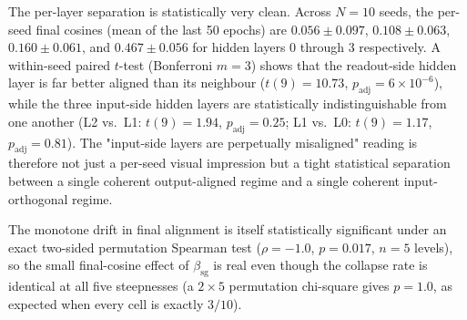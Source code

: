 
The per-layer separation is statistically very clean. Across $N = 10$ seeds,
the per-seed final cosines (mean of the last 50 epochs) are
$0.056 \pm 0.097$, $0.108 \pm 0.063$, $0.160 \pm 0.061$, and
$0.467 \pm 0.056$ for hidden layers $0$ through $3$ respectively. A
within-seed paired $t$-test (Bonferroni $m = 3$) shows that the readout-side
hidden layer is far better aligned than its neighbour ($t(9) = 10.73$,
$p_{\mathrm{adj}} = 6 \times 10^{-6}$), while the three input-side hidden
layers are statistically indistinguishable from one another (L2 vs.\ L1:
$t(9) = 1.94$, $p_{\mathrm{adj}} = 0.25$; L1 vs.\ L0: $t(9) = 1.17$,
$p_{\mathrm{adj}} = 0.81$). The "input-side layers are perpetually
misaligned" reading is therefore not just a per-seed visual impression
but a tight statistical separation between a single coherent
output-aligned regime and a single coherent input-orthogonal regime.



The monotone drift in final alignment is itself statistically significant
under an exact two-sided permutation Spearman test
($\rho = -1.0$, $p = 0.017$, $n = 5$ levels), so the small final-cosine
effect of $\beta_{\mathrm{sg}}$ is real even though the collapse rate is
identical at all five steepnesses (a $2 \times 5$ permutation chi-square
gives $p = 1.0$, as expected when every cell is exactly $3/10$).



